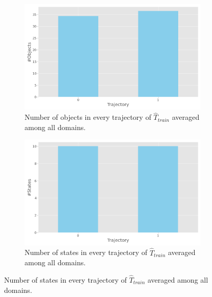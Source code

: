 
\begin{figure}[ht!]
  \centering

  \begin{subfigure}[b]{0.48\textwidth}
    \includegraphics[width=\textwidth]{figures/2_traces/objects.png}
    \caption{Number of objects in every trajectory of $\hat{T}_{train}$ averaged among all domains.}
  \end{subfigure}
  \hfill
  \begin{subfigure}[b]{0.48\textwidth}
    \includegraphics[width=\textwidth]{figures/2_traces/states.png}
    \caption{Number of states in every trajectory of $\hat{T}_{train}$ averaged among all domains.}
  \end{subfigure}
  
\end{figure} 
